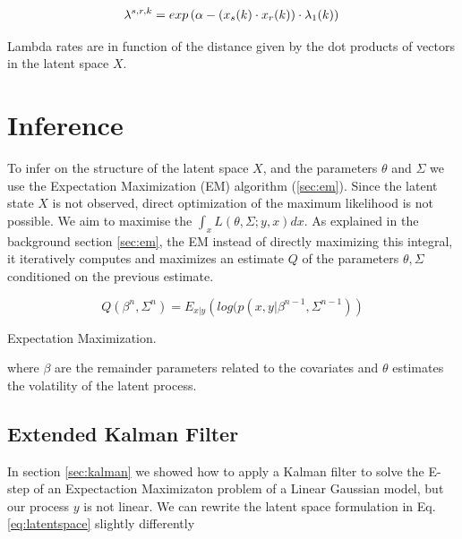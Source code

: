 \documentclass[mscthesis]{usiinfthesis}
\begin{document}
\begin{eqfloat}
\begin{equation}
\lambda^{s, r, k} = exp\left(\alpha-(x_s(k) \cdot x_r(k)) \cdot \lambda_1(k) \right) \\
\label{eq:ourmodel_lambda}
\end{equation}
\caption{Lambda rates are in function of the distance given by the dot products of vectors in the latent space $X$.}
\end{eqfloat}

\section{Inference}
To infer on the structure of the latent space $X$, and the parameters $\theta$  and $\Sigma$ we use the Expectation Maximization (EM) algorithm (\ref{sec:em}). Since the latent state $X$ is not observed, direct optimization of the maximum likelihood is not possible. We aim to maximise the $\int_x L(\theta, \Sigma ; y, x) dx$. As explained in the background section \ref{sec:em}, the EM instead of directly maximizing this integral, it iteratively computes and maximizes an estimate $Q$ of the parameters $\theta, \Sigma$ conditioned on the previous estimate. 

\begin{eqfloat}
\begin{equation}
Q(\beta^{n}, \Sigma^{n}) = E_{x|y} \left( log(p(x, y | \beta^{n-1}, \Sigma^{n-1}) \right)
\end{equation}
\caption{Expectation Maximization.}
\label{eq:expectation_maximization}
\end{eqfloat}

where $\beta$ are the remainder parameters related to the covariates and $\theta$ estimates the volatility of the latent process.


\subsection{Extended Kalman Filter}

In section \ref{sec:kalman} we showed how to apply a Kalman filter to solve the E-step of an Expectaction Maximizaton problem of a Linear Gaussian model, but our process $y$ is not linear. We can rewrite the latent space formulation in Eq. \ref{eq:latentspace} slightly differently
\end{document}
